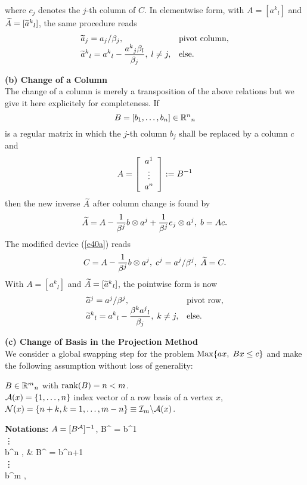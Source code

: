 where $c_j$ denotes the $j$-th column of $C$. In elementwise form, with $A =
[a^k{}_l]$ and $\wi{A} = [\wi{a}^k{}_l]$, the same procedure reads
%
\[ \ba{.}{ll}
\wi{a}_j = a_j/\beta _j, &\mbox{pivot column},\\
\dis \wi{a}^k{}_l = a^k{}_l -\frac{a^k{}_j\beta _l}{\beta _j}, \; l \neq
j, & \mbox{else}.
\ea{.}
\]
\par
%
{\bf (b) Change of a Column}\\
The change of a column is merely a transposition of the above relations but we
give it here explicitely for completeness. If
\[
B = [b_1, \ldots, b_n] \in \Bbb{R}^n{}_n
\]
is a regular matrix in which the $j$-th column $b_j$ shall be replaced by a
column $c$ and
\[
A = \ba{[}{c}a^1 \\ \vdots \\ a^n\ea{]} := B^{-1}
\]
then the new inverse $\wi{A}$ after column change is found by
\[
\wi{A} = A - \frac{1}{\beta ^j}b \otimes a^j +
\frac{1}{\beta ^j}e_j \otimes a^j, \; b = Ac.
\]
The modified device (\ref{e40a}) reads
%
\begin{equation} \label{e41a}
C = A - \frac{1}{\beta ^j}b \otimes a^j, \;
c^j = a^j/\beta ^j, \; \wi{A} =  C.
\end{equation}
%
With $A = [a^k{}_l]$ and $\wi{A} = [\wi{a}^k{}_l]$, the pointwise form is now
\[
\ba{.}{ll}
\wi{a}^j = a^j/\beta ^j, &\mbox{pivot row},\\
\dis \wi{a}^k{}_l = a^k{}_l -\frac{\beta ^ka^j{}_l}{\beta  _j}, \; k
\neq j, & \mbox{else}.
\ea{.}
\]
\par
{\bf (c) Change of Basis in the Projection Method}\\
We consider a global swapping step for the problem $\Max\{ax, \; Bx \leq c\}$
and make the following assumption without loss of generality:
%
\begin{assumption} \label{a7}
$B \in \Bbb{R}^m{}_n$ with $\rank (B) = n < m$.\\
$\A(x) = \{1,\ldots,n\}$ index vector of a row basis of a vertex
$x$,\\
$\N(x) = \{n+k, k = 1,\ldots,m - n\} \equiv \I_m \backslash \A(x)$.
\end{assumption}
%
{\bf Notations:} $A = [B^{\A}]^{-1}$,
%
\beqn {}
B^{\A} = \ba{[}{l} b^1 \\ \vdots \\
b^n \ea{]}, & B^{\N} = \ba{[}{l} b^{n+1} \\  \vdots \\b^m \ea{]},
